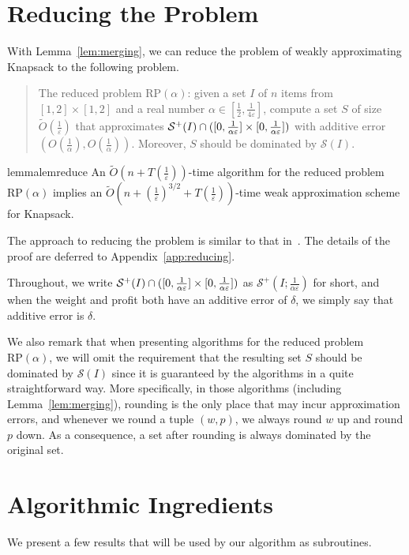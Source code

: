 \documentclass[a4paper,UKenglish,cleveref, autoref, thm-restate, pdfa]{lipics-v2021}
\newcommand{\eps}{\varepsilon}
\begin{document}
\section{Reducing the Problem}\label{sec:reduce}
With Lemma~\ref{lem:merging}, we can reduce the problem of weakly approximating Knapsack to the following problem. 
\begin{quote}
The reduced problem $\mathrm{RP}(\alpha)$: given a set $I$ of $n$ items from $[1,2] \times [1,2]$ and a real number $\alpha \in [\frac{1}{2}, \frac{1}{4\eps}]$, compute a set $S$ of size $\tilde{O}(\frac{1}{\eps})$ that approximates ${\cal S}^+(I) \cap ([0,\frac{1}{\alpha\eps}] \times [0, \frac{1}{\alpha\eps}])$ with additive error $(O(\frac{1}{\alpha}), O(\frac{1}{\alpha}))$. Moreover, $S$ should be dominated by $\mathcal{S}(I)$.
\end{quote}

\begin{restatable}{lemma}{lemreduce}
\label{lem:reduce}
    An $\tilde{O}(n + T(\frac{1}{\eps}))$-time algorithm for the reduced problem $\mathrm{RP}(\alpha)$ implies an $\tilde{O}(n + (\frac{1}{\eps})^{3/2} + T(\frac{1}{\eps}))$-time weak approximation scheme for Knapsack.
\end{restatable}

The approach to reducing the problem is similar to that in~\cite{CLMZ24bSTOCKnapsack}. The details of the proof are deferred to Appendix~\ref{app:reducing}.

Throughout, we write ${\cal S}^+(I) \cap ([0,\frac{1}{\alpha\eps}] \times [0, \frac{1}{\alpha\eps}])$ as $\mathcal{S}^+(I; \frac{1}{\alpha\eps})$ for short, and when the weight and profit both have an additive error of $\delta$, we simply say that additive error is $\delta$.

We also remark that when presenting algorithms for the reduced problem $\mathrm{RP}(\alpha)$, we will omit the requirement that the resulting set $S$ should be dominated by $\mathcal{S}(I)$ since it is guaranteed by the algorithms in a quite straightforward way. More specifically, in those algorithms (including Lemma~\ref{lem:merging}), rounding is the only place that may incur approximation errors, and whenever we round a tuple $(w,p)$, we always round $w$ up and round $p$ down. As a consequence, a set after rounding is always dominated by the original set. 

\section{Algorithmic Ingredients}\label{sec:tools}
We present a few results that will be used by our algorithm as subroutines.
\end{document}
